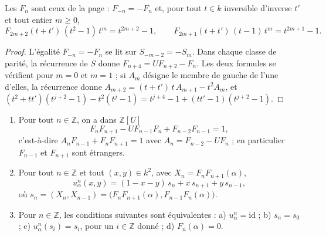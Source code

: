 \begin{enonce}
Les $F_n$ sont ceux de la page : $F_{-n} = -F_n$ et, pour tout $t \in k$ inversible d'inverse $t'$ et tout entier $m \geq 0$,
\[ F_{2m+2}(t + t')\,(t^2 - 1)\,t^m = t^{2m+2} - 1, \qquad F_{2m+1}(t + t')\,(t - 1)\,t^m = t^{2m+1} - 1. \]
\end{enonce}

\begin{proof}
L'égalité $F_{-n} = -F_n$ se lit sur $S_{-m-2} = -S_m$. Dans chaque classe de parité, la récurrence de $S$ donne $F_{n+4} = U F_{n+2} - F_n$. Les deux formules se vérifient pour $m = 0$ et $m = 1$ ; si $A_m$ désigne le membre de gauche de l'une d'elles, la récurrence donne $A_{m+2} = (t + t')\,t\,A_{m+1} - t^2 A_m$, et $(t^2 + tt')(t^{j+2} - 1) - t^2(t^j - 1) = t^{j+4} - 1 + (tt' - 1)(t^{j+2} - 1)$.
\end{proof}

\begin{encadre}
\begin{theoreme}
\leavevmode
\begin{enumerate}
\item Pour tout $n \in \mathbb Z$, on a dans $\mathbb Z[U]$
\[ F_n F_{n+1} - U F_{n-1} F_n + F_{n-2} F_{n-1} = 1, \]
c'est-à-dire $A_n F_{n-1} + F_n F_{n+1} = 1$ avec $A_n = F_{n-2} - U F_n$ ; en particulier $F_{n-1}$ et $F_{n+1}$ sont étrangers.
\item Pour tout $n \in \mathbb Z$ et tout $(x, y) \in k^2$, avec $X_n = F_n F_{n+1}(\alpha)$,
\[ u_\alpha^n(x, y) = (1 - x - y)\, s_n + x\, s_{n+1} + y\, s_{n-1}, \]
où $s_n = (X_n, X_{n-1}) = \bigl(F_n F_{n+1}(\alpha), F_{n-1} F_n(\alpha)\bigr)$.
\item Pour $n \in \mathbb Z$, les conditions suivantes sont équivalentes : a) $u_\alpha^n = \mathrm{id}$ ; b) $s_n = s_0$ ; c) $u_\alpha^n(s_i) = s_i$, pour un $i \in \mathbb Z$ donné ; d) $F_n(\alpha) = 0$.
\end{enumerate}
\end{theoreme}
\end{encadre}

